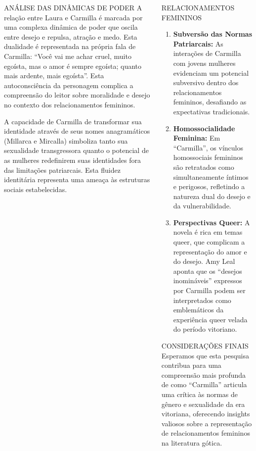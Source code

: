 \documentclass[final,a0paper,portrait]{beamer}
\begin{document}
\begin{frame}[t]
\begin{columns}[t]
\begin{column}{0.33\textwidth}
\begin{block}{\centering ANÁLISE DAS DINÂMICAS DE PODER}
A relação entre Laura e Carmilla é marcada por uma complexa dinâmica de poder que oscila entre desejo e repulsa, atração e medo. Esta dualidade é representada na própria fala de Carmilla: ``Você vai me achar cruel, muito egoísta, mas o amor é sempre egoísta; quanto mais ardente, mais egoísta''. Esta autoconsciência da personagem complica a compreensão do leitor sobre moralidade e desejo no contexto dos relacionamentos femininos.

\vspace{0.5cm}
A capacidade de Carmilla de transformar sua identidade através de seus nomes anagramáticos (Millarca e Mircalla) simboliza tanto sua sexualidade transgressora quanto o potencial de as mulheres redefinirem suas identidades fora das limitações patriarcais. Esta fluidez identitária representa uma ameaça às estruturas sociais estabelecidas.
\end{block}
\end{column}

\begin{column}{0.31\textwidth}
\begin{block}{\centering RELACIONAMENTOS FEMININOS}
\begin{enumerate}
\item \textbf{Subversão das Normas Patriarcais:} As interações de Carmilla com jovens mulheres evidenciam um potencial subversivo dentro dos relacionamentos femininos, desafiando as expectativas tradicionais.

\item \textbf{Homossocialidade Feminina:} Em ``Carmilla'', os vínculos homossociais femininos são retratados como simultaneamente íntimos e perigosos, refletindo a natureza dual do desejo e da vulnerabilidade.

\item \textbf{Perspectivas Queer:} A novela é rica em temas queer, que complicam a representação do amor e do desejo. Amy Leal aponta que os ``desejos inomináveis'' expressos por Carmilla podem ser interpretados como emblemáticos da experiência queer velada do período vitoriano.
\end{enumerate}
\end{block}

\begin{block}{\centering CONSIDERAÇÕES FINAIS}
Esperamos que esta pesquisa contribua para uma compreensão mais profunda de como ``Carmilla'' articula uma crítica às normas de gênero e sexualidade da era vitoriana, oferecendo insights valiosos sobre a representação de relacionamentos femininos na literatura gótica.


\end{block}
\end{column}
\end{columns}
\end{frame}
\end{document}
